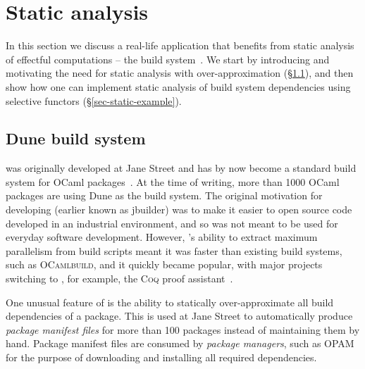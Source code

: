 \section{Static analysis}\label{sec-static}

In this section we discuss a real-life application that benefits from static
analysis of effectful computations -- the \Dune build system~\citep{dune}. We
start by introducing \Dune and motivating the need for static analysis with
over-approximation (\S\ref{sec-dune-intro}), and then show how one can implement
static analysis of build system dependencies using selective functors
(\S\ref{sec-static-example}).

\subsection{Dune build system}\label{sec-dune-intro}

\Dune was originally developed at Jane Street and has by now become a standard
build system for OCaml packages~\citep{dune}. At the time of writing, more than
1000 OCaml packages are using Dune as the build system. The original motivation
for developing \Dune (earlier known as \textsf{jbuilder}) was to make it easier
to open source code developed in an industrial environment, and so \Dune was not
meant to be used for everyday software development. However, \Dune's ability to
extract maximum parallelism from build scripts meant it was faster than existing
build systems, such as \textsc{OCamlbuild}, and it quickly became popular, with
major projects switching to \Dune, for example, the \textsc{Coq} proof
assistant~\citep{bertot2013coq}.


One unusual feature of \Dune is the ability to statically
over-approximate all build dependencies of a package. This is used at
Jane Street to automatically produce \emph{package manifest files} for
more than 100 packages instead of maintaining them by hand. Package
manifest files are consumed by \emph{package managers}, such as
OPAM~\citep{opam} for the purpose of downloading and installing all
required dependencies.


